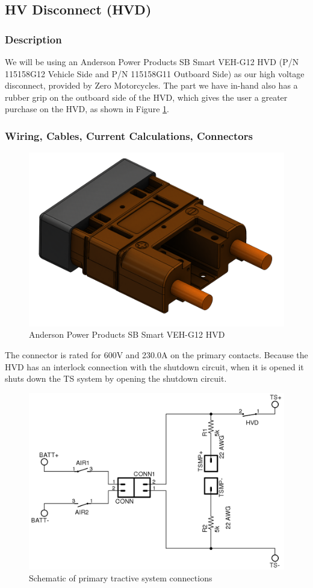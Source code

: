 \documentclass{article}
\begin{document}
    \subsection{HV Disconnect (HVD)} \label{hvdsection}

        \subsubsection{Description}

            We will be using an Anderson Power Products SB Smart VEH-G12 HVD (P/N 115158G12 Vehicle Side and P/N 115158G11 Outboard Side) as our high voltage disconnect, provided by Zero Motorcycles. The part we have in-hand also has a rubber grip on the outboard side of the HVD, which gives the user a greater purchase on the HVD, as shown in Figure \ref{HVDoneside}.

        \subsubsection{Wiring, Cables, Current Calculations, Connectors}

            \begin{figure}[H]
                \centering
                \includegraphics[width = 0.25 \textwidth]{anderson_hvd_interlock}
                \caption{Anderson Power Products SB Smart VEH-G12 HVD}
                \label{HVDoneside}
            \end{figure}


            The connector is rated for 600V and 230.0A on the primary contacts. Because the HVD has an interlock connection with the shutdown circuit, when it is opened it shuts down the TS system by opening the shutdown circuit.

            \begin{figure}[H]
                \centering
                \includegraphics[width = 0.75 \textwidth]{HVD}
                \caption{Schematic of primary tractive system connections}
                \label{HVDschem}
            \end{figure}
\end{document}
